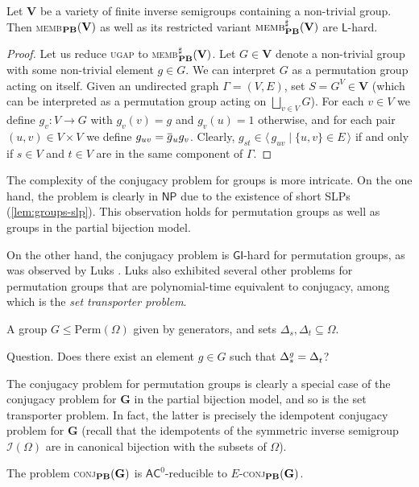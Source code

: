 \documentclass[anonymous,letter,UKenglish,cleveref,autoref,thm-restate]{lipics-v2021}
\makeatletter
\renewcommand{\leq}{\leqslant}
\newcommand{\sse}{\subseteq}
\newcommand{\gen}[1]{\langle #1 \rangle}
\newcommand{\ACz}{\ensuremath{\mathsf{AC}^0}\xspace}
\newcommand{\LOGSPACE}{\ensuremath{\mathsf{L}}\xspace}
\newcommand{\NP}{\ensuremath{\mathsf{NP}}\xspace}
\newcommand{\GI}{\ensuremath{\mathsf{GI}}}
\newcommand{\vV}{\ensuremath{\mathbf{V}}}
\newcommand{\vG}{\ensuremath{\mathbf{G}}}
\newcommand{\ISym}{\cI}
\newcommand{\Sym}{\mathrm{Perm}}
\newcommand\nindent{.5pt}
\newcommand\noverline[1]{\kern\nindent\overline{\kern-\nindent#1\kern-\nindent}\kern\nindent}
\newcommand{\ov}[1]{\noverline{#1}}
\newcommand{\cI}{\mathcal{I}}
\theoremstyle{plain}
\theoremstyle{plain}
\providecommand\iitem{}
\providecommand\qitem{}
\newcommand\decproblem@iitem@label{\rlap{Input.}\phantom{Question.}}
\newcommand\decproblem@qitem@label{Question.}
\newenvironment{decproblem}{\begin{description}\begin{samepage}\renewcommand{\iitem}{\item[\decproblem@iitem@label]}\renewcommand{\qitem}{\item[\decproblem@qitem@label]}}{\end{samepage}\end{description}}
\newcommand{\dMemb}[2][]{\textup{\textsc{memb${}_{\mathbf{#1}}\expandafter\ifx\expandafter\relax\detokenize{#2}\relax\else(#2)\fi$}}}
\newcommand{\dConj}[2][]{\textup{\textsc{conj${}_{\mathbf{#1}}\expandafter\ifx\expandafter\relax\detokenize{#2}\relax\else(#2)\fi$}}}
\newcommand{\dMembS}[2][]{\textup{\textsc{memb${}^{\sharp}_{\mathbf{#1}}\expandafter\ifx\expandafter\relax\detokenize{#2}\relax\else(#2)\fi$}}}
\newcommand{\prob}[1]{\textup{\textsc{#1}}\xspace}
\newcommand{\dUGAP}{\prob{ugap}}
\newcommand{\dEConj}[2][]{\ensuremath{E}\textnormal{-}\dConj[#1]{#2}}
\makeatother
\begin{document}
\begin{proposition}\label{lem:nontrivial-group-hard}
	Let $\vV$ be a variety of finite inverse semigroups containing a non-trivial group.
	Then \dMemb[PB]{\vV} as well as its restricted variant $\dMembS[PB]{\vV}$ are \LOGSPACE-hard.
\end{proposition}
\begin{proof}
	Let us reduce \dUGAP to \dMembS[PB]{\vV}. 
	Let $G \in \vV$ denote a non-trivial group with some non-trivial element $g \in G$.
	We can interpret $G$ as a permutation group acting on itself.
	Given an undirected graph $\Gamma = (V,E)$, set $S = G^V \in \vV$ (which can be interpreted as a permutation group acting on $\bigsqcup_{v\in V} G$). 
  For each $v \in V$ we define $g_v\colon V \to G$ with $g_v(v) = g$ and $g_v(u) = 1$ otherwise, and for each pair $(u,v) \in V\times V$ we define $g_{uv} = \ov g_{u} g_{v}$.
  Clearly, $g_{st} \in \gen{\,g_{uv} \mid \{u,v\} \in E\,}$ if and only if $s \in V$ and $t \in V$ are in the same component of $\Gamma$.
\end{proof}


The complexity of the conjugacy problem for groups is more intricate.
On the one hand, the problem is clearly in \NP{} due to the existence of short SLPs (\cref{lem:groups-slp}).
This observation holds for permutation groups as well as groups in the partial bijection model.

On the other hand, the conjugacy problem is \GI-hard for permutation groups, as was observed by Luks \cite{Luks93}.
Luks also exhibited several other problems for permutation groups that are polynomial-time equivalent to conjugacy, among which is the \emph{set transporter problem}.

\begin{decproblem}
	\iitem A group $G \leq \Sym(\Omega)$ given by generators, and sets $\Delta_s, \Delta_t \sse \Omega$.
	\qitem Does there exist an element $g \in G$ such that $\Delta_s^g = \Delta^{\mathstrut}_t$?
\end{decproblem}

The conjugacy problem for permutation groups is clearly a special case of the conjugacy problem for $\vG$ in the partial bijection model, and so is the set transporter problem.
In fact, the latter is precisely the idempotent conjugacy problem for $\vG$ (recall that the idempotents of the symmetric inverse semigroup $\ISym(\Omega)$ are in canonical bijection with the subsets of $\Omega$).

\begin{lemma}
  The problem \dConj[PB]{\vG} is $\ACz$-reducible to \dEConj[PB]{\vG}.
\end{lemma}
\end{document}
